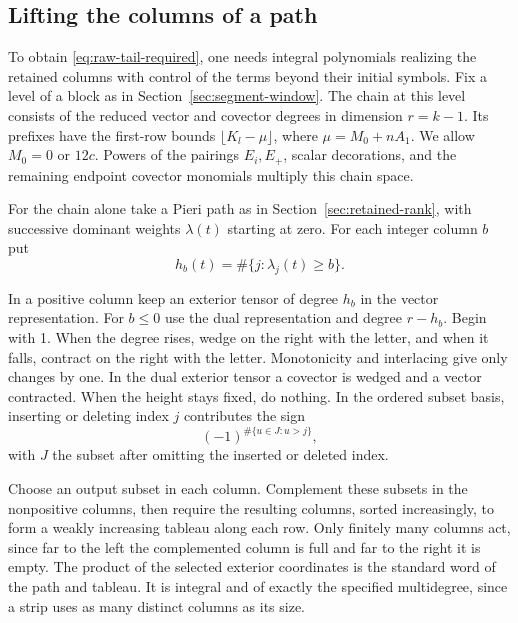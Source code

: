 \subsection{Lifting the columns of a path}
\label{sec:column-lifts}
\hypertarget{source-column-lifts}{}

To obtain \eqref{eq:raw-tail-required}, one needs integral polynomials realizing the retained columns with control of the terms beyond their initial symbols. Fix a level of
a block as in Section~\ref{sec:segment-window}. The chain at this
level consists of the reduced vector and covector degrees in
dimension \(r=k-1\). Its prefixes have the first-row bounds
\(\lfloor K_l-\mu\rfloor\), where
\(\mu=M_0+nA_1\). We allow \(M_0=0\) or \(12c\).
Powers of the pairings \(E_i,E_+\), scalar decorations, and the
remaining endpoint covector monomials multiply this chain space.

\begin{paramdefinition}\label{hyp:standard-path-words}
For the chain alone take a Pieri path as in
Section~\ref{sec:retained-rank}, with successive dominant weights
\(\lambda(t)\) starting at zero. For each integer column \(b\)
put
\[
 h_b(t)=\#\{j:\lambda_j(t)\ge b\}.
\]

In a positive column keep an exterior tensor of degree \(h_b\)
in the vector representation. For \(b\le0\) use the dual
representation and degree \(r-h_b\). Begin with 1. When the degree
rises, wedge on the right with the letter, and when it falls,
contract on the right with the letter. Monotonicity and interlacing
give only changes by one. In the dual exterior tensor a covector is
wedged and a vector contracted. When the height stays fixed, do
nothing. In the ordered subset basis, inserting or deleting index
\(j\) contributes the sign
\[
 (-1)^{\#\{u\in J:u>j\}},
\]
with \(J\)
the subset after omitting the inserted or deleted index.

Choose an output subset in each column. Complement these subsets
in the nonpositive columns, then require the resulting columns,
sorted increasingly, to form a weakly increasing tableau along
each row. Only finitely many columns act, since far to the left
the complemented column is full and far to the right it is empty.
The product of the selected exterior coordinates is the standard
word of the path and tableau. It is integral and of exactly the
specified multidegree, since a strip uses as many distinct columns
as its size.
\end{paramdefinition}

